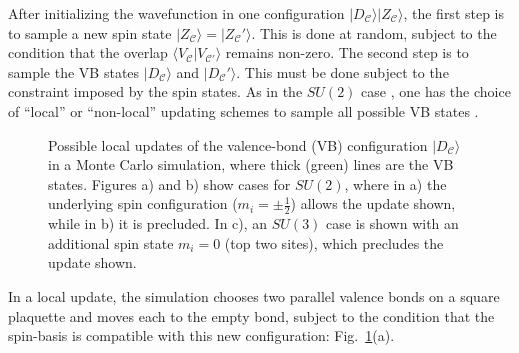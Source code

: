 \documentclass[11pt]{iopart}
\begin{document}
After initializing the wavefunction in one configuration $|D_{\mathcal C}  \rangle | Z_{\mathcal C}  \rangle$, the first step is to sample a new spin state $|Z_{\mathcal C}   \rangle = |Z_{\mathcal C} ' \rangle$.  This is done at random, subject to the condition that the overlap $\langle V_{\mathcal C} | V_{\mathcal C'} \rangle$ remains non-zero.  The second step is to sample the VB states $|D_{\mathcal C}  \rangle$ and $|D_{\mathcal C} ' \rangle$.  This must be done subject to the constraint imposed by the spin states.
As in the $SU(2)$ case \cite{Ju2012}, one has the choice of ``local'' or ``non-local'' updating schemes to sample all possible VB states \cite{sandvik2010loop}.
\begin{figure}[t]
 \begin{center}
 \end{center}
 \caption{Possible local updates of the valence-bond (VB) configuration $|D_{\mathcal{C}} \rangle$ in a Monte Carlo simulation, where thick (green) lines are the VB states.  Figures a) and b) show cases for $SU(2)$, where in a) the underlying spin configuration ($m_i = \pm \frac{1}{2}$) allows the update shown, while in b) it is precluded.  In c), an $SU(3)$ case is shown with an additional spin state $m_i = 0$ (top two sites), which precludes the update shown.}
 \label{fig:updates}
 \end{figure}
%
In a local update, the simulation chooses two parallel valence bonds on a square plaquette and moves each to the empty bond, subject to the condition that the spin-basis is compatible with this new configuration: Fig.~\ref{fig:updates}(a).
\end{document}
